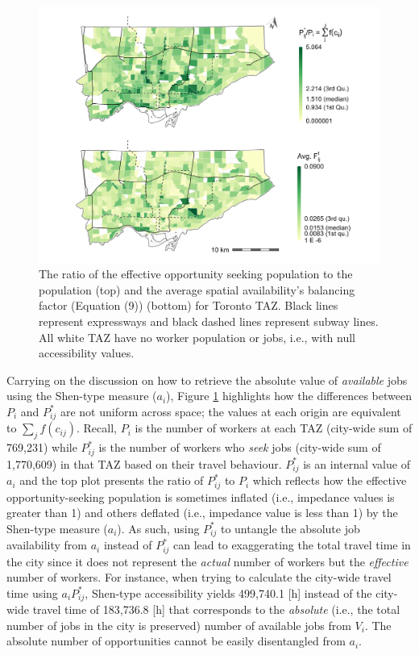 \documentclass[]{elsarticle} %
\begin{document}
\begin{figure}
\includegraphics[width=1\linewidth]{images/internal-values-plot} \caption{\label{fig:internal-values-plot}  The ratio of the effective opportunity seeking population to the population (top) and the average spatial availability's balancing factor (Equation (9)) (bottom) for Toronto TAZ. Black lines represent expressways and black dashed lines represent subway lines. All white TAZ have no worker population or jobs, i.e., with null accessibility values.}\label{fig:internal-values-plot}
\end{figure}

Carrying on the discussion on how to retrieve the absolute value of
\emph{available} jobs using the Shen-type measure (\(a_i\)), Figure
\ref{fig:internal-values-plot} highlights how the differences between
\(P_i\) and \(P_{ij}^*\) are not uniform across space; the values at
each origin are equivalent to \(\sum_j f(c_{ij})\). Recall, \(P_i\) is
the number of workers at each TAZ (city-wide sum of 769,231) while
\(P_{ij}^*\) is the number of workers who \emph{seek} jobs (city-wide
sum of 1,770,609) in that TAZ based on their travel behaviour.
\(P_{ij}^*\) is an internal value of \(a_i\) and the top plot presents
the ratio of \(P_{ij}^*\) to \(P_i\) which reflects how the effective
opportunity-seeking population is sometimes inflated (i.e., impedance
values is greater than 1) and others deflated (i.e., impedance value is
less than 1) by the Shen-type measure (\(a_i\)). As such, using
\(P_{ij}^*\) to untangle the absolute job availability from \(a_i\)
instead of \(P_{ij}^*\) can lead to exaggerating the total travel time
in the city since it does not represent the \emph{actual} number of
workers but the \emph{effective} number of workers. For instance, when
trying to calculate the city-wide travel time using \(a_i P_{ij}^*\),
Shen-type accessibility yields 499,740.1 {[}h{]} instead of the
city-wide travel time of 183,736.8 {[}h{]} that corresponds to the
\emph{absolute} (i.e., the total number of jobs in the city is
preserved) number of available jobs from \(V_i\). The absolute number of
opportunities cannot be easily disentangled from \(a_i\).
\end{document}
